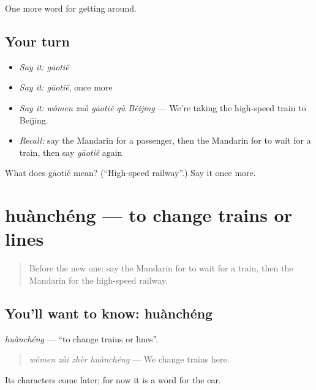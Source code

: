 \begin{grammarlens}[title={What you've built}]
One more word for getting around.
\end{grammarlens}

\subsection*{Your turn}
\begin{itemize}
\raggedright
  \item \emph{Say it:} \emph{gāotiě}
  \item \emph{Say it:} \emph{gāotiě}, once more
  \item \emph{Say it:} \emph{wǒmen zuò gāotiě qù Běijīng} — We're taking the high-speed train to Beijing.
  \item \emph{Recall:} say the Mandarin for a passenger, then the Mandarin for to wait for a train, then say \emph{gāotiě} again
\end{itemize}

\begin{tcolorbox}[breakable,colback=teal!4,colframe=teal!35!black,title={Before you move on}]
What does gāotiě mean? (\textquotedblleft{}High-speed railway\textquotedblright{}.) Say it once more.
\end{tcolorbox}
\section[huànchéng]{huànchéng — to change trains or lines}

\label{lesson:ZH-C402-huancheng}



\begin{quote}
Before the new one: say the Mandarin for to wait for a train, then the Mandarin for the high-speed railway.
\end{quote}

\subsection*{You'll want to know: huànchéng}
\emph{huànchéng} — \textquotedblleft{}to change trains or lines\textquotedblright{}.

\begin{quote}
\emph{wǒmen zài zhèr huànchéng} — We change trains here.
\end{quote}

Its characters come later; for now it is a word for the ear.

